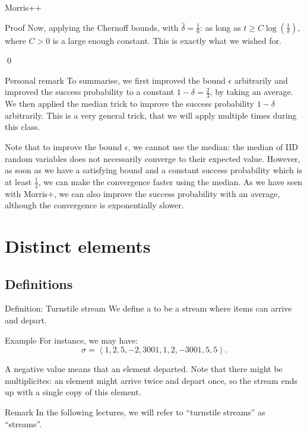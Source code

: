 \documentclass[a4paper]{article}
\begin{document}
\begin{parag}{Morris++}
\begin{subparag}{Proof}
        Now, applying the Chernoff bounds, with $\hat{\delta} = \frac{1}{6}$: 
        as long as $t \geq C \log\left(\frac{1}{\delta}\right)$, where $C > 0$ is a large enough constant. This is exactly what we wished for.
        
        \qed
    \end{subparag}

    \begin{subparag}{Personal remark}
        To summarise, we first improved the bound $\epsilon$ arbitrarily and improved the success probability to a constant $1 - \delta = \frac{2}{3}$, by taking an average. We then applied the median trick to improve the success probability $1 - \delta$ arbitrarily. This is a very general trick, that we will apply multiple times during this class.

        Note that to improve the bound $\epsilon$, we cannot use the median: the median of IID random variables does not necessarily converge to their expected value. However, as soon as we have a satisfying bound and a constant success probability which is at least $\frac{1}{2}$, we can make the convergence faster using the median. As we have seen with Morris+, we can also improve the success probability with an average, although the convergence is exponentially slower.
    \end{subparag}
\end{parag}

\section{Distinct elements}
\subsection{Definitions}

\begin{parag}{Definition: Turnstile stream}
    We define a  to be a stream where items can arrive and depart.  

    \begin{subparag}{Example}
        For instance, we may have:
        \[\sigma = \left\langle 1, 2, 5, -2, 3001, 1, 2, -3001, 5, 5 \right\rangle.\]
        
        A negative value means that an element departed. Note that there might be multiplicites: an element might arrive twice and depart once, so the stream ends up with a single copy of this element.
    \end{subparag}

    \begin{subparag}{Remark}
        In the following lectures, we will refer to ``turnstile streams'' as ``streams''.
    \end{subparag}
\end{parag}
\end{document}
